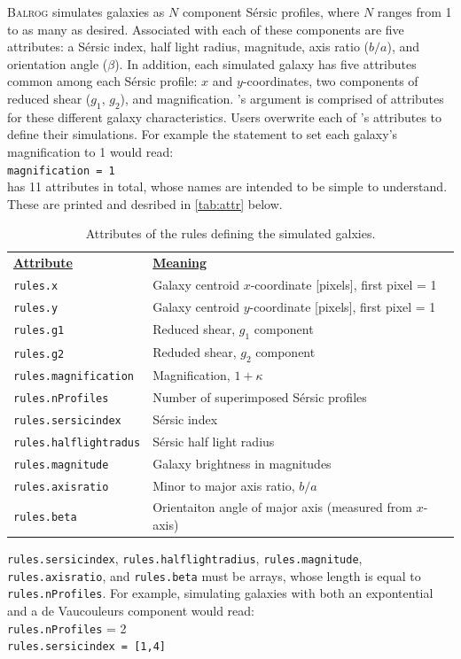\documentclass[12pt]{book}
\newcommand{\balrog}{\textsc{Balrog}}
\newcommand{\inline}{\\[0.4cm]}
\newcommand{\sersic}{S\'{e}rsic}
\begin{document}
\balrog{} simulates galaxies as $N$ component \sersic{} profiles, 
where $N$ ranges from 1 to as many as desired. Associated
with each of these components are five attributes: a \sersic{} index,
half light radius, magnitude, axis ratio ($b/a$), and orientation
angle ($\beta$). In addition, each simulated galaxy has five attributes
common among each \sersic{} profile: $x$ and $y$-coordinates,
two components of reduced shear ($g_1$, $g_2$), and magnification.
\simfunc{}'s argument \simrules{} is comprised of attributes
for these different galaxy characteristics. Users overwrite
each of \simrules{}'s attributes to define their simulations.
For example the statement to set each galaxy's magnification
to 1 would read:
\inline
\texttt{magnification = 1}
\inline
\simrules{} has 11 attributes in total, whose names are intended to be simple to understand.
These are printed and desribed in \autoref{tab:attr} below.

\vspace{10pt}
\begin{longtabu} to \linewidth {l l}
\caption{Attributes of the rules defining the simulated galxies.} \label{tab:attr}\\
\underline{\textbf{Attribute}} & \underline{\textbf{Meaning}} \\
\texttt{rules.x} & Galaxy centroid $x$-coordinate [pixels], first pixel = 1\\
\texttt{rules.y} & Galaxy centroid $y$-coordinate [pixels], first pixel = 1\\
\texttt{rules.g1} & Reduced shear, $g_1$ component \\
\texttt{rules.g2} & Reduded shear, $g_2$ component \\
\texttt{rules.magnification} & Magnification, $1 + \kappa$ \\
\texttt{rules.nProfiles} & Number of superimposed \sersic{} profiles \\
\texttt{rules.sersicindex} & \sersic{} index \\
\texttt{rules.halflightradus} & \sersic{} half light radius \\
\texttt{rules.magnitude} & Galaxy brightness in magnitudes \\
\texttt{rules.axisratio} & Minor to major axis ratio, $b/a$ \\
\texttt{rules.beta} & Orientaiton angle of major axis (measured from $x$-axis)
\end{longtabu}

\noindent \texttt{rules.sersicindex}, \texttt{rules.halflightradius}, \texttt{rules.magnitude}, \texttt{rules.axisratio},
and \texttt{rules.beta} must be arrays, whose length is equal to \texttt{rules.nProfiles}. For example, simulating
galaxies with both an expontential and a de Vaucouleurs component would read:
\inline
\texttt{rules.nProfiles} = 2 \\
\texttt{rules.sersicindex = [1,4]}
\end{document}
